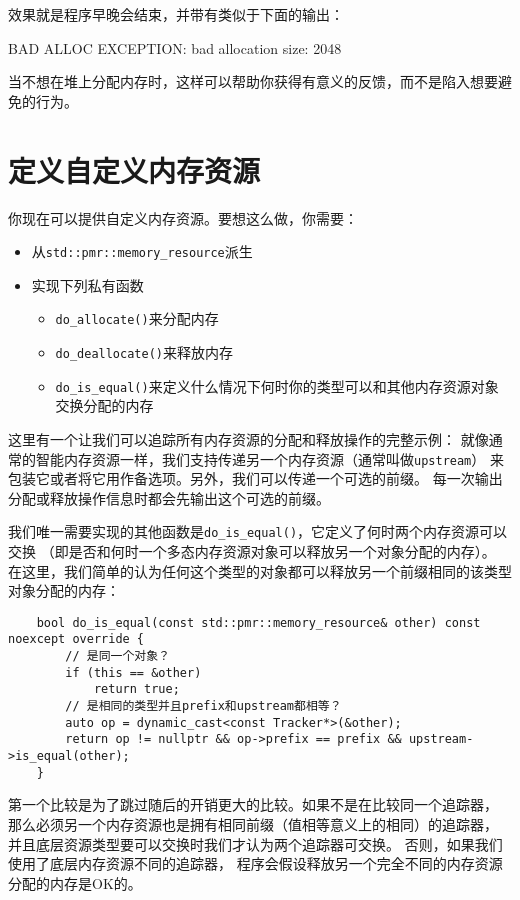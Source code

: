 效果就是程序早晚会结束，并带有类似于下面的输出：
\begin{blacklisting}
    BAD ALLOC EXCEPTION: bad allocation
    size: 2048
\end{blacklisting}
当不想在堆上分配内存时，这样可以帮助你获得有意义的反馈，而不是陷入想要避免的行为。


\section{定义自定义内存资源}\label{ch29.2}
你现在可以提供自定义内存资源。要想这么做，你需要：
\begin{itemize}
    \item 从\texttt{std::pmr::memory\_resource}派生
    \item 实现下列私有函数
    \begin{itemize}
        \item \texttt{do\_allocate()}来分配内存
        \item \texttt{do\_deallocate()}来释放内存
        \item \texttt{do\_is\_equal()}来定义什么情况下何时你的类型可以和其他内存资源对象交换分配的内存
    \end{itemize}
\end{itemize}
这里有一个让我们可以追踪所有内存资源的分配和释放操作的完整示例：
就像通常的智能内存资源一样，我们支持传递另一个内存资源（通常叫做\texttt{upstream}）
来包装它或者将它用作备选项。另外，我们可以传递一个可选的前缀。
每一次输出分配或释放操作信息时都会先输出这个可选的前缀。

我们唯一需要实现的其他函数是\texttt{do\_is\_equal()}，它定义了何时两个内存资源可以交换
（即是否和何时一个多态内存资源对象可以释放另一个对象分配的内存）。
在这里，我们简单的认为任何这个类型的对象都可以释放另一个前缀相同的该类型对象分配的内存：
\begin{lstlisting}
    bool do_is_equal(const std::pmr::memory_resource& other) const noexcept override {
        // 是同一个对象？
        if (this == &other)
            return true;
        // 是相同的类型并且prefix和upstream都相等？
        auto op = dynamic_cast<const Tracker*>(&other);
        return op != nullptr && op->prefix == prefix && upstream->is_equal(other);
    }
\end{lstlisting}
第一个比较是为了跳过随后的开销更大的比较。如果不是在比较同一个追踪器，
那么必须另一个内存资源也是拥有相同前缀（值相等意义上的相同）的追踪器，
并且底层资源类型要可以交换时我们才认为两个追踪器可交换。
否则，如果我们使用了底层内存资源不同的追踪器，
程序会假设释放另一个完全不同的内存资源分配的内存是OK的。

